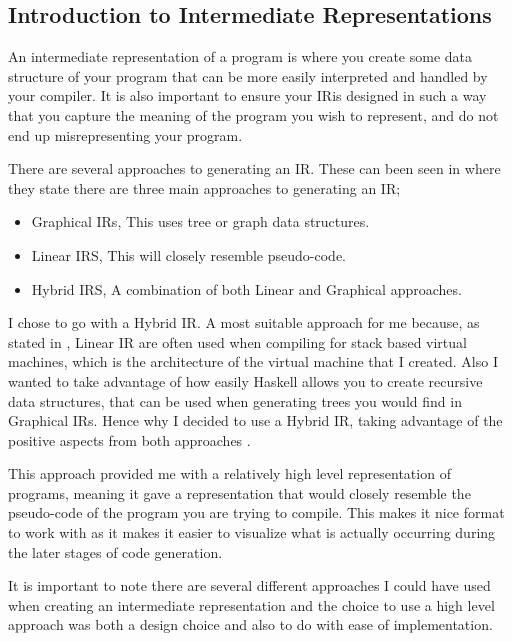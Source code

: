 \subsection{Introduction to Intermediate Representations}

An intermediate representation of a program is where you create some data structure of your program that can be more easily interpreted and handled by your compiler. It is also important to ensure your IR\footnotemark[1] is designed in such a way that you capture the meaning of the program you wish to represent, and do not end up misrepresenting your program.


There are several approaches to generating an IR. These can been seen in \cite[p.~223]{EngComp2012} where they state there are three main approaches to generating an IR; 

\begin{itemize}
\item Graphical IRs, This uses tree or graph data structures.  
\item Linear IRS, This will closely resemble pseudo-code. 
\item Hybrid IRS, A combination of both Linear and Graphical approaches.
\end{itemize}

I chose to go with a Hybrid IR. A most suitable approach for me because, as stated in \cite[p.~113]{CompDes2005}, Linear IR are often used when compiling for stack based virtual machines, which is the architecture of the virtual machine that I created. Also I wanted to take advantage of how easily Haskell allows you to create recursive data structures, that can be used when generating trees you would find in Graphical IRs. Hence why I decided to use a Hybrid IR, taking advantage of the positive aspects from both approaches .  

This approach provided me with a relatively high level representation of programs, meaning it gave a representation that would closely resemble the pseudo-code of the program you are trying to compile. This makes it nice format to work with as it makes it easier to visualize what is actually occurring during the later stages of code generation. 

It is important to note there are several different approaches I could have used when creating an intermediate representation and the choice to use a high level approach was both a design choice and also to do with ease of implementation. 

